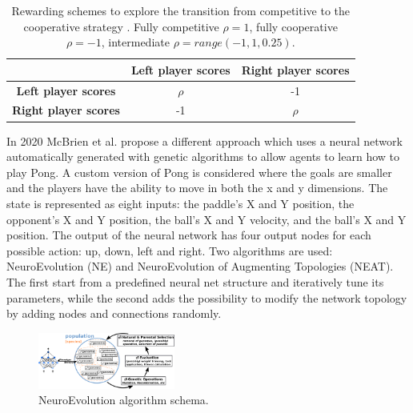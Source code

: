 \begin{table}[ht]
  \renewcommand{\arraystretch}{1.3}
  \caption{Rewarding schemes to explore the transition from competitive to the cooperative strategy \cite{tampuu2017multiagent}. Fully competitive $\rho = 1$, fully cooperative $\rho = -1$, intermediate $\rho = range(-1, 1, 0.25)$.}
  \label{tab:reward-scheme-2}
  \centering
  \begin{tabular}{@{}ccc@{}}
    \toprule
                                                   & \textbf{Left player scores} & \textbf{Right player scores} \\ \midrule
    \multicolumn{1}{c}{\textbf{Left player scores}} & $\rho$                   & -1                       \\ 
    \multicolumn{1}{c}{\textbf{Right player scores}} & -1                       & $\rho$                   \\ \bottomrule
  \end{tabular}
\end{table}

In 2020 McBrien et al. \cite{mcbrien2020learning} propose a different approach which uses a neural network automatically generated with genetic algorithms to allow agents to learn how to play Pong.
%
A custom version of Pong is considered where the goals are smaller and the players have the ability to move in both the x and y dimensions.
%
The state is represented as eight inputs: the paddle's X and Y position, the opponent's X and Y position, the ball's X and Y velocity,
and the ball's X and Y position.
%
The output of the neural network has four output nodes for each possible action: up, down, left and right.
%
Two algorithms are used: NeuroEvolution (NE) and NeuroEvolution of Augmenting Topologies (NEAT).
The first start from a predefined neural net structure and iteratively tune its parameters, while the second adds the possibility to modify the network topology by adding nodes and connections randomly.

\begin{figure}[ht]
  \centering
  \includegraphics[width=0.4\textwidth]{images/neuroevolution.png}
  \caption{NeuroEvolution algorithm schema.}
  \label{fig:ne}
\end{figure}